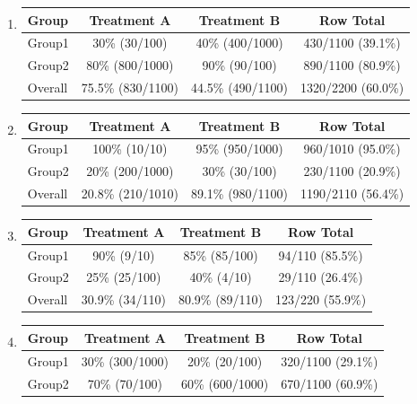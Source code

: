 \documentclass[9pt]{article}
\begin{document}
\begin{enumerate}
\item
{\renewcommand{\arraystretch}{1.3}
\begin{tabular}{lccc}
\hline
Group & Treatment A & Treatment B & Row Total \\
\hline
Group1 & 30\% (30/100) & 40\% (400/1000) & 430/1100 (39.1\%) \\
Group2 & 80\% (800/1000) & 90\% (90/100) & 890/1100 (80.9\%) \\
\hline
Overall & 75.5\% (830/1100) & 44.5\% (490/1100) & 1320/2200 (60.0\%) \\
\hline
\end{tabular}}


\vspace{1cm}
\item
{\renewcommand{\arraystretch}{1.3}
\begin{tabular}{lccc}
\hline
Group & Treatment A & Treatment B & Row Total \\
\hline
Group1 & 100\% (10/10) & 95\% (950/1000) & 960/1010 (95.0\%) \\
Group2 & 20\% (200/1000) & 30\% (30/100) & 230/1100 (20.9\%) \\
\hline
Overall & 20.8\% (210/1010) & 89.1\% (980/1100) & 1190/2110 (56.4\%) \\
\hline
\end{tabular}}
\vspace{1cm}
\item
{\renewcommand{\arraystretch}{1.3}
\begin{tabular}{lccc}
\hline
Group & Treatment A & Treatment B & Row Total \\
\hline
Group1 & 90\% (9/10) & 85\% (85/100) & 94/110 (85.5\%) \\
Group2 & 25\% (25/100) & 40\% (4/10) & 29/110 (26.4\%) \\
\hline
Overall & 30.9\% (34/110) & 80.9\% (89/110) & 123/220 (55.9\%) \\
\hline
\end{tabular}}
\vspace{1cm}
\item
{\renewcommand{\arraystretch}{1.3}
\begin{tabular}{lccc}
\hline
Group & Treatment A & Treatment B & Row Total \\
\hline
Group1 & 30\% (300/1000) & 20\% (20/100) & 320/1100 (29.1\%) \\
Group2 & 70\% (70/100) & 60\% (600/1000) & 670/1100 (60.9\%) \\

\end{tabular}}
\end{enumerate}
\end{document}
